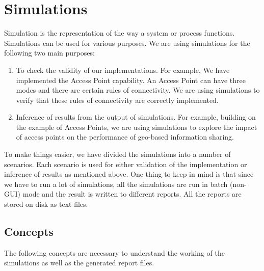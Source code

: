 \chapter{Simulations}\label{chapter:simulations}

Simulation is the representation of the way a system or process functions. Simulations can be used for various purposes. We are using simulations for the following two main purposes:

\begin{enumerate}
 \item To check the validity of our implementations. For example, We have implemented the Access Point capability. An Access Point can have three modes and there are certain rules of connectivity. We are using simulations to verify that these rules of connectivity are correctly implemented.
 \item Inference of results from the output of simulations. For example, building on the example of Access Points, we are using simulations to explore the impact of access points on the performance of geo-based information sharing.
\end{enumerate}

To make things easier, we have divided the simulations into a number of scenarios. Each scenario is used for either validation of the implementation or inference of results as mentioned above. One thing to keep in mind is that since we have to run a lot of simulations, all the simulations are run in batch (non-GUI) mode and the result is written to different reports. All the reports are stored on disk as text files.

\section{Concepts}
The following concepts are necessary to understand the working of the simulations as well as the generated report files.

